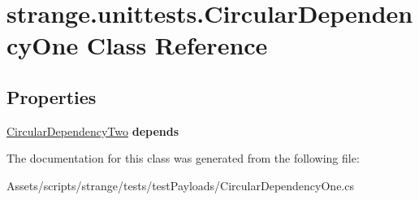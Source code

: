 \hypertarget{classstrange_1_1unittests_1_1_circular_dependency_one}{\section{strange.\-unittests.\-Circular\-Dependency\-One Class Reference}
\label{classstrange_1_1unittests_1_1_circular_dependency_one}
}
\subsection*{Properties}
\begin{DoxyCompactItemize}
\item 
\hypertarget{classstrange_1_1unittests_1_1_circular_dependency_one_ae00d8a10bd078a7166249ec66747710f}{\hyperlink{classstrange_1_1unittests_1_1_circular_dependency_two}{Circular\-Dependency\-Two} {\bfseries depends}}\label{classstrange_1_1unittests_1_1_circular_dependency_one_ae00d8a10bd078a7166249ec66747710f}

\end{DoxyCompactItemize}


The documentation for this class was generated from the following file\-:\begin{DoxyCompactItemize}
\item 
Assets/scripts/strange/tests/test\-Payloads/Circular\-Dependency\-One.\-cs\end{DoxyCompactItemize}
